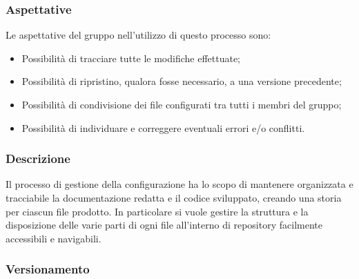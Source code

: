 \subsubsection{Aspettative}
Le aspettative del gruppo \groupName{} nell'utilizzo di questo processo sono:
\begin{itemize}
    \item Possibilità di tracciare tutte le modifiche effettuate;
    \item Possibilità di ripristino, qualora fosse necessario, a una versione precedente;
    \item Possibilità di condivisione dei file configurati tra tutti i membri del gruppo;
    \item Possibilità di individuare e correggere eventuali errori e/o conflitti.
\end{itemize}

\subsubsection{Descrizione}
Il processo di gestione della configurazione ha lo scopo di mantenere organizzata e tracciabile la documentazione redatta e il codice sviluppato, creando una storia per ciascun file prodotto.
In particolare si vuole gestire la struttura e la disposizione delle varie parti di ogni file all'interno di repository\glo{} facilmente accessibili e navigabili.

\subsubsection{Versionamento}
